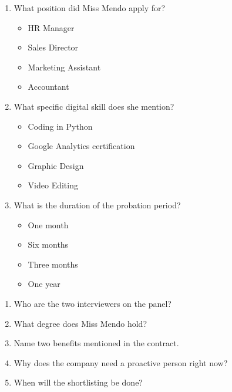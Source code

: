 \documentclass[11pt]{article}
\begin{document}
\begin{exercice}
\begin{enumerate}
    \item What position did Miss Mendo apply for?
    \begin{itemize}
        \item[a] HR Manager
        \item[b] Sales Director
        \item[c] Marketing Assistant
        \item[d] Accountant
    \end{itemize}
    \item What specific digital skill does she mention?
    \begin{itemize}
        \item[a] Coding in Python
        \item[b] Google Analytics certification
        \item[c] Graphic Design
        \item[d] Video Editing
    \end{itemize}
    \item What is the duration of the probation period?
    \begin{itemize}
        \item[a] One month
        \item[b] Six months
        \item[c] Three months
        \item[d] One year
    \end{itemize}
\end{enumerate}
\end{exercice}

\begin{exercice}
\begin{enumerate}
    \item Who are the two interviewers on the panel?
    \item What degree does Miss Mendo hold?
    \item Name two benefits mentioned in the contract.
    \item Why does the company need a proactive person right now?
    \item When will the shortlisting be done?
\end{enumerate}
\end{exercice}
\end{document}
